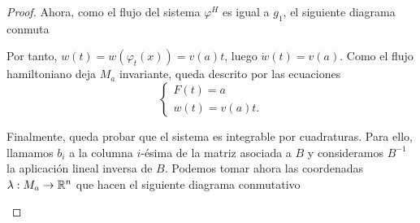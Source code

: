 \begin{proof}
Ahora, como el flujo del sistema $\varphi^H$ es igual a $g_1$, el siguiente diagrama conmuta
\begin{center}
 \end{center}
 Por tanto, $w(t)=w(\varphi_t(x))=v(a) t$, luego $\dot w(t)=v(a)$. Como el flujo hamiltoniano deja $M_a$ invariante, queda descrito por las ecuaciones
 \begin{equation*}
   \begin{cases}
     F(t)=a \\
     w(t)=v(a)t.
   \end{cases}
 \end{equation*}

 Finalmente, queda probar que el sistema es integrable por cuadraturas. Para ello, llamamos $b_i$ a la columna $i$-ésima de la matriz asociada a $B$ y consideramos $B^{-1}$ la aplicación lineal inversa de $B$. Podemos tomar ahora las coordenadas $\lambda:M_a\rightarrow \mathbb{R}^n$ que hacen el siguiente diagrama conmutativo
 \begin{center}
 \end{center}


\end{proof}
